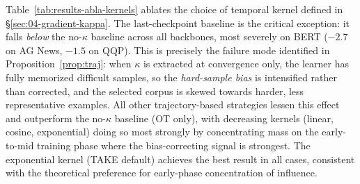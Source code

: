 \begin{foldable}
  Table~\ref{tab:results-abla-kernels} ablates the choice of temporal kernel defined in \S\ref{sec:04-gradient-kappa}.
  The last-checkpoint baseline is the critical exception: it falls \textit{below} the no-$\kappa$ baseline across all backbones, most severely on BERT ($-2.7$ on AG News, $-1.5$ on QQP).
  This is precisely the failure mode identified in Proposition~\ref{prop:traj}: when $\kappa$ is extracted at convergence only, the learner has fully memorized difficult samples, so the \textit{hard-sample bias} is intensified rather than corrected, and the selected corpus is skewed towards harder, less representative examples.
  All other trajectory-based strategies lessen this effect and outperform the no-$\kappa$ baseline (OT only), with decreasing kernels (linear, cosine, exponential) doing so most strongly by concentrating mass on the early-to-mid training phase where the bias-correcting signal is strongest.
  The exponential kernel (TAKE default) achieves the best result in all cases, consistent with the theoretical preference for early-phase concentration of influence.
\end{foldable}
